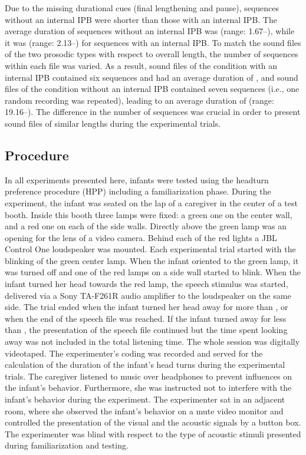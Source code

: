 \documentclass[output=paper]{langscibook}
\begin{document}
Due to the missing durational cues (final lengthening and pause), sequences without an internal IPB were shorter than those with an internal IPB. The average duration of sequences without an internal IPB was  (range: 1.67–), while it was  (range: 2.13–) for sequences with an internal IPB. To match the sound files of the two prosodic types with respect to overall length, the number of sequences within each file was varied. As a result, sound files of the condition with an internal IPB contained six sequences and had an average duration of , and sound files of the condition without an internal IPB contained seven sequences (i.e., one random recording was repeated), leading to an average duration of  (range: 19.16–). The difference in the number of sequences was crucial in order to present sound files of similar lengths during the experimental trials.

\subsection{Procedure}
In all experiments presented here, infants were tested using the headturn preference procedure (HPP) including a familiarization phase. During the experiment, the infant was seated on the lap of a caregiver in the center of a test booth. Inside this booth three lamps were fixed: a green one on the center wall, and a red one on each of the side walls. Directly above the green lamp was an opening for the lens of a video camera. Behind each of the red lights a JBL Control One loudspeaker was mounted. Each experimental trial started with the blinking of the green center lamp. When the infant oriented to the green lamp, it was turned off and one of the red lamps on a side wall started to blink. When the infant turned her head towards the red lamp, the speech stimulus was started, delivered via a Sony TA-F261R audio amplifier to the loudspeaker on the same side. The trial ended when the infant turned her head away for more than , or when the end of the speech file was reached. If the infant turned away for less than , the presentation of the speech file continued but the time spent looking away was not included in the total listening time. The whole session was digitally videotaped. The experimenter’s coding was recorded and served for the calculation of the duration of the infant’s head turns during the experimental trials. The caregiver listened to music over headphones to prevent influences on the infant’s behavior. Furthermore, she was instructed not to interfere with the infant’s behavior during the experiment. The experimenter sat in an adjacent room, where she observed the infant’s behavior on a mute video monitor and controlled the presentation of the visual and the acoustic signals by a button box. The experimenter was blind with respect to the type of acoustic stimuli presented during familiarization and testing.
\end{document}
